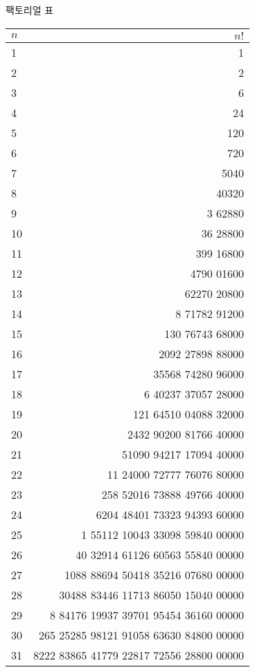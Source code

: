 \documentclass[10pt, a4paper]{article}
\begin{document}
\begin{center}
    \huge{팩토리얼 표}\normalsize\\
    \begin{longtable}{l | r}
        \(n\) & \(n!\)\\
        \hline\hline
        1 & 1 \\
        2 & 2 \\
        3 & 6 \\
        4 & 24 \\
        5 & 120 \\
        \hline
        6 & 720 \\
        7 & 5040 \\
        8 & 40320 \\
        9 & 3 62880 \\
        10 & 36 28800 \\
        \hline
        11 & 399 16800 \\
        12 & 4790 01600 \\
        13 & 62270 20800 \\
        14 & 8 71782 91200 \\
        15 & 130 76743 68000 \\
        \hline
        16 & 2092 27898 88000 \\
        17 & 35568 74280 96000 \\
        18 & 6 40237 37057 28000 \\
        19 & 121 64510 04088 32000 \\
        20 & 2432 90200 81766 40000 \\
        \hline
        21 & 51090 94217 17094 40000 \\
        22 & 11 24000 72777 76076 80000 \\
        23 & 258 52016 73888 49766 40000 \\
        24 & 6204 48401 73323 94393 60000 \\
        25 & 1 55112 10043 33098 59840 00000 \\
        \hline
        26 & 40 32914 61126 60563 55840 00000 \\
        27 & 1088 88694 50418 35216 07680 00000 \\
        28 & 30488 83446 11713 86050 15040 00000 \\
        29 & 8 84176 19937 39701 95454 36160 00000 \\
        30 & 265 25285 98121 91058 63630 84800 00000 \\
        \hline
        31 & 8222 83865 41779 22817 72556 28800 00000 \\

\end{longtable}
\end{center}
\end{document}
